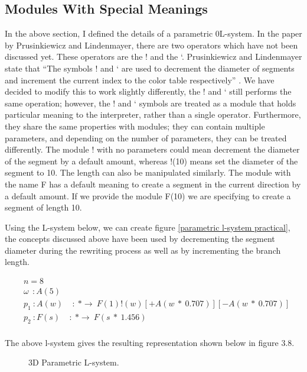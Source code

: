 \subsection{Modules With Special Meanings}

In the above section, I defined the details of a parametric 0L-system. In the paper by Prusinkiewicz and Lindenmayer, there are two operators which have not been discussed yet. These operators are the ! and the ‘. Prusinkiewicz and Lindenmayer state that “The symbols ! and ‘ are used to decrement the diameter of segments and increment the current index to the color table respectively” \cite{prusinkiewicz2012algorithmic}. We have decided to modify this to work slightly differently, the ! and ‘ still performs the same operation; however, the ! and ‘ symbols are treated as a module that holds particular meaning to the interpreter, rather than a single operator. Furthermore, they share the same properties with modules; they can contain multiple parameters, and depending on the number of parameters, they can be treated differently. The module ! with no parameters could mean decrement the diameter of the segment by a default amount, whereas !(10) means set the diameter of the segment to 10. The length can also be manipulated similarly. The module with the name F has a default meaning to create a segment in the current direction by a default amount. If we provide the module F(10) we are specifying to create a segment of length 10.

Using the L-system below, we can create figure \ref{parametric l-system practical}, the concepts discussed above have been used by decrementing the segment diameter during the rewriting process as well as by incrementing the branch length.

\begin{equation} \label{parametric l-system practical}
\begin{aligned}
	&n=8 \\
	&\omega~~ : A(5)\\
	&p_1~ :  A(w)~~~~~ :~ * \rightarrow~ F(1)!(w)[+A(w~*~0.707)][-A(w~*~0.707)]\\
	&p_2~ :  F(s)~~~~~ :~ * \rightarrow~ F(s~*~1.456)\\
\end{aligned}
\end{equation}

The above l-system gives the resulting representation shown below in figure 3.8. 

\begin{figure}[htbp]
	{\centering
		\vspace{7px}
		\setlength{\fboxrule}{1pt}
		\caption{3D Parametric L-system.}
	}
\end{figure}
\FloatBarrier

